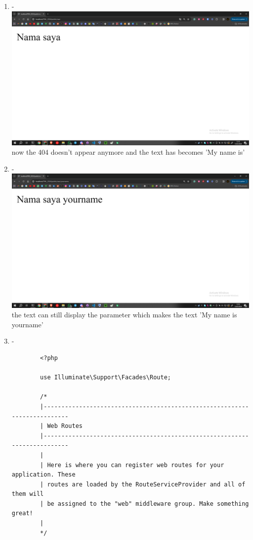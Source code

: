 \documentclass[12pt,titlepage]{article}
\begin{document}
\begin{enumerate}[label=\alph*.]
\begin{verbatim}
        Route::get('/articles/{id}', function ($id) {
            return 'Article Page with ID ' . $id;
        });      
    \end{verbatim}
    \item - \\ \includegraphics[width=.9\textwidth]{images/figures/optional parameters b.png} \\ now the 404 doesn't appear anymore and the text has becomes 'My name is'
    \item - \\ \includegraphics[width=.9\textwidth]{images/figures/optional parameters c.png} \\ the text can still display the parameter which makes the text 'My name is yourname'
    \item -
    \begin{verbatim}
        <?php

        use Illuminate\Support\Facades\Route;
        
        /*
        |--------------------------------------------------------------------------
        | Web Routes
        |--------------------------------------------------------------------------
        |
        | Here is where you can register web routes for your application. These
        | routes are loaded by the RouteServiceProvider and all of them will
        | be assigned to the "web" middleware group. Make something great!
        |
        */
        

\end{verbatim}
\end{enumerate}
\end{document}
